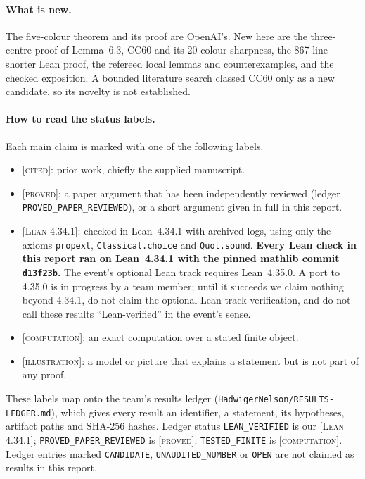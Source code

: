 \documentclass[11pt]{article}
\theoremstyle{definition}
\theoremstyle{remark}
\newcommand{\st}[1]{\textsc{[#1]}}
\begin{document}
\paragraph{What is new.} The five-colour theorem and its proof are OpenAI's. New here are the three-centre proof of Lemma~6.3, CC60 and its 20-colour sharpness, the 867-line shorter Lean proof, the refereed local lemmas and counterexamples, and the checked exposition. A bounded literature search classed CC60 only as a new candidate, so its novelty is not established.

\paragraph{How to read the status labels.}
Each main claim is marked with one of the following labels.
\begin{itemize}
\item \st{cited}: prior work, chiefly the supplied manuscript.
\item \st{proved}: a paper argument that has been independently reviewed (ledger \texttt{PROVED\_\allowbreak{}PAPER\_\allowbreak{}REVIEWED}), or a short argument given in full in this report.
\item \st{Lean 4.34.1}: checked in Lean~4.34.1 with archived logs, using only the axioms \texttt{propext}, \texttt{Classical.\allowbreak{}choice} and \texttt{Quot.sound}. \textbf{Every Lean check in this report ran on Lean~4.34.1 with the pinned mathlib commit \texttt{d13f23b}.} The event's optional Lean track requires Lean~4.35.0. A port to 4.35.0 is in progress by a team member; until it succeeds we claim nothing beyond 4.34.1, do not claim the optional Lean-track verification, and do not call these results ``Lean-verified'' in the event's sense.
\item \st{computation}: an exact computation over a stated finite object.
\item \st{illustration}: a model or picture that explains a statement but is not part of any proof.
\end{itemize}
These labels map onto the team's results ledger (\texttt{Hadwiger\allowbreak{}Nelson/\allowbreak{}RESULTS-\allowbreak{}LEDGER.\allowbreak{}md}), which gives every result an identifier, a statement, its hypotheses, artifact paths and SHA-256 hashes. Ledger status \texttt{LEAN\_\allowbreak{}VERIFIED} is our \st{Lean 4.34.1}; \texttt{PROVED\_\allowbreak{}PAPER\_\allowbreak{}REVIEWED} is \st{proved}; \texttt{TESTED\_\allowbreak{}FINITE} is \st{computation}. Ledger entries marked \texttt{CANDIDATE}, \texttt{UNAUDITED\_\allowbreak{}NUMBER} or \texttt{OPEN} are not claimed as results in this report.
\end{document}
